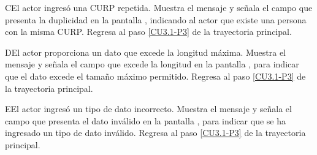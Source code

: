 	\begin{UCtrayectoriaA}{C}{El actor ingresó una CURP repetida.}
		\UCpaso[\UCsist] Muestra el mensaje  y señala el campo que presenta la duplicidad en la pantalla , indicando al actor que existe una persona con la misma CURP.
		\UCpaso Regresa al paso \ref{CU3.1-P3} de la trayectoria principal.
	\end{UCtrayectoriaA}

	\begin{UCtrayectoriaA}{D}{El actor proporciona un dato que excede la longitud máxima.}
		\UCpaso[\UCsist] Muestra el mensaje  y señala el campo que excede la longitud en la pantalla , para indicar que el dato excede el tamaño máximo permitido.
		\UCpaso Regresa al paso \ref{CU3.1-P3} de la trayectoria principal.
	\end{UCtrayectoriaA}

	\begin{UCtrayectoriaA}{E}{El actor ingresó un tipo de dato incorrecto.}
		\UCpaso[\UCsist] Muestra el mensaje  y señala el campo que presenta el dato inválido en la pantalla , para indicar que se ha ingresado un tipo de dato inválido.
		\UCpaso Regresa al paso \ref{CU3.1-P3} de la trayectoria principal.
	\end{UCtrayectoriaA}

